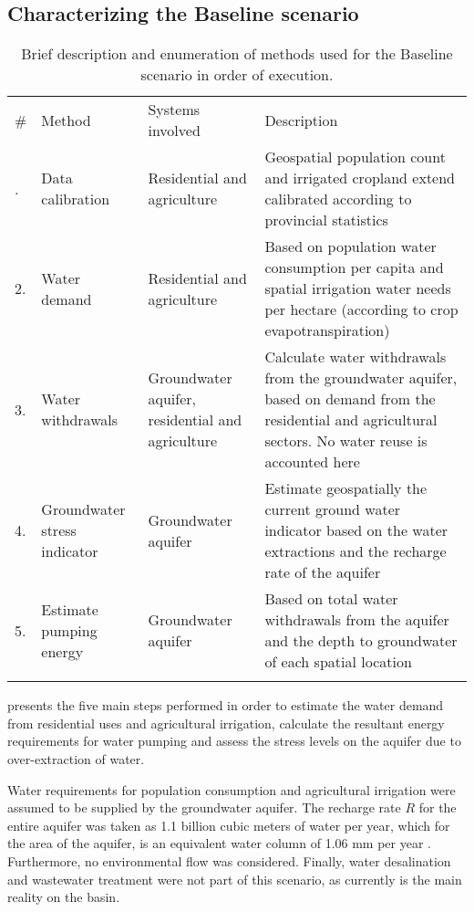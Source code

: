 \subsection{Characterizing the Baseline scenario}
\begin{table*}[!b]
    \caption{\label{tbl:methodsBaseline}Brief description and enumeration of methods used for the Baseline scenario in order of execution.}
	\footnotesize{
	\begin{tabular}{@{}l P{1.1in} P{1.2in} P{3.12in}}
		\br
		\# & Method & Systems involved & Description\\
		. & Data calibration & Residential and agriculture & Geospatial population count and irrigated cropland extend calibrated according to provincial statistics\\
	    2. & Water demand & Residential and agriculture & Based on population water consumption per capita and spatial irrigation water needs per hectare (according to crop evapotranspiration) \\
	    3. & Water withdrawals & Groundwater aquifer, residential and agriculture & Calculate water withdrawals from the groundwater aquifer, based on demand from the residential and agricultural sectors. No water reuse is accounted here\\
	    4. & Groundwater stress indicator & Groundwater aquifer & Estimate geospatially the current ground water indicator based on the water extractions and the recharge rate of the aquifer\\
	    5. & Estimate pumping energy & Groundwater aquifer & Based on total water withdrawals from the aquifer and the depth to groundwater of each spatial location \\
		\br
	\end{tabular}
	}
\end{table*}
 presents the five main steps performed in order to estimate the water demand from residential uses and agricultural irrigation, calculate the resultant energy requirements for water pumping and assess the stress levels on the aquifer due to over-extraction of water.

Water requirements for population consumption and agricultural irrigation were assumed to be supplied by the groundwater aquifer. The recharge rate $R$ for the entire aquifer was taken as 1.1 billion cubic meters of water per year, which for the area of the aquifer, is an equivalent water column of 1.06 mm per year \cite{BetterValorizationIrrigation2015}. Furthermore, no environmental flow was considered. Finally, water desalination and wastewater treatment were not part of this scenario, as currently is the main reality on the basin.

